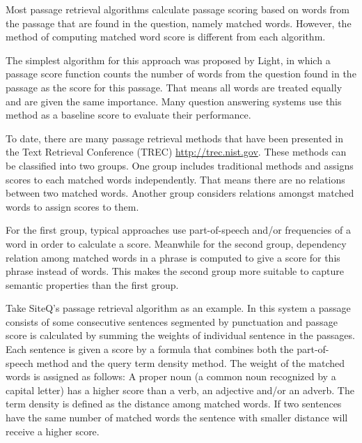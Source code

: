 Most passage retrieval algorithms calculate passage scoring based on words from the passage that are found in the question, namely matched words. However, the method of computing matched word score is different from each algorithm. 

The simplest algorithm for this approach was proposed by Light\cite{light2002aec}, in which a passage score function counts the number of words from the question found in the passage as the score for this passage. That means all words are treated equally and are given the same importance. Many question answering systems use this method as a baseline score to evaluate their performance. 

To date, there are many passage retrieval methods that have been presented in the Text Retrieval Conference (TREC) \url{http://trec.nist.gov}. These methods can be classified into two groups. One group includes traditional methods and assigns scores to each matched words independently. That means there are no relations between two matched words. Another group  considers relations amongst matched words to assign scores to them. 

For the first group, typical approaches use part-of-speech and/or frequencies of a word in order to calculate a score. Meanwhile for the second group, dependency relation among matched words in a phrase is computed to give a score for this phrase instead of words. This makes the second group more suitable to capture semantic properties than the first group.

Take SiteQ's passage retrieval algorithm \cite{lee2002seh} as an example. In this system a passage consists of some consecutive sentences segmented by punctuation and passage score is calculated by summing the weights of individual sentence in the passages. Each sentence is given a score by a formula that combines both the part-of-speech method and the query term density method. The weight of the matched words is assigned as follows: A proper noun (a common noun recognized by a capital letter) has a higher score than a verb, an adjective and/or an adverb. The term density is defined as the distance among matched words. If two sentences have the same number of matched words the sentence with smaller distance will receive a higher score.

